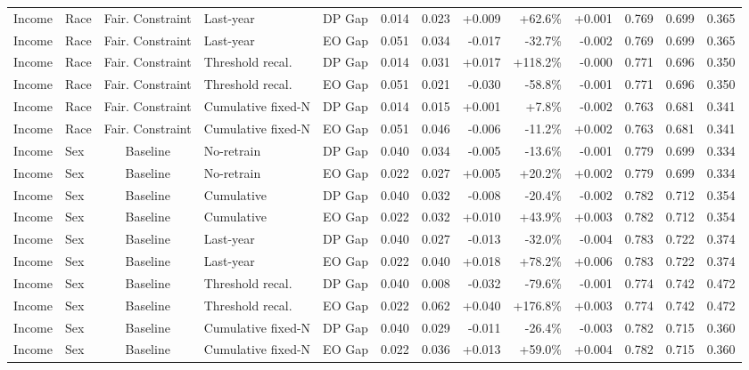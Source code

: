 \begin{longtable}{llcllrrrrrrrr}
Income & Race & Fair. Constraint & Last-year & DP Gap & 0.014 & 0.023 & +0.009 & +62.6\% & +0.001 & 0.769 & 0.699 & 0.365 \\
Income & Race & Fair. Constraint & Last-year & EO Gap & 0.051 & 0.034 & -0.017 & -32.7\% & -0.002 & 0.769 & 0.699 & 0.365 \\
Income & Race & Fair. Constraint & Threshold recal. & DP Gap & 0.014 & 0.031 & +0.017 & +118.2\% & -0.000 & 0.771 & 0.696 & 0.350 \\
Income & Race & Fair. Constraint & Threshold recal. & EO Gap & 0.051 & 0.021 & -0.030 & -58.8\% & -0.001 & 0.771 & 0.696 & 0.350 \\
Income & Race & Fair. Constraint & Cumulative fixed-N & DP Gap & 0.014 & 0.015 & +0.001 & +7.8\% & -0.002 & 0.763 & 0.681 & 0.341 \\
Income & Race & Fair. Constraint & Cumulative fixed-N & EO Gap & 0.051 & 0.046 & -0.006 & -11.2\% & +0.002 & 0.763 & 0.681 & 0.341 \\
Income & Sex & Baseline & No-retrain & DP Gap & 0.040 & 0.034 & -0.005 & -13.6\% & -0.001 & 0.779 & 0.699 & 0.334 \\
Income & Sex & Baseline & No-retrain & EO Gap & 0.022 & 0.027 & +0.005 & +20.2\% & +0.002 & 0.779 & 0.699 & 0.334 \\
Income & Sex & Baseline & Cumulative & DP Gap & 0.040 & 0.032 & -0.008 & -20.4\% & -0.002 & 0.782 & 0.712 & 0.354 \\
Income & Sex & Baseline & Cumulative & EO Gap & 0.022 & 0.032 & +0.010 & +43.9\% & +0.003 & 0.782 & 0.712 & 0.354 \\
Income & Sex & Baseline & Last-year & DP Gap & 0.040 & 0.027 & -0.013 & -32.0\% & -0.004 & 0.783 & 0.722 & 0.374 \\
Income & Sex & Baseline & Last-year & EO Gap & 0.022 & 0.040 & +0.018 & +78.2\% & +0.006 & 0.783 & 0.722 & 0.374 \\
Income & Sex & Baseline & Threshold recal. & DP Gap & 0.040 & 0.008 & -0.032 & -79.6\% & -0.001 & 0.774 & 0.742 & 0.472 \\
Income & Sex & Baseline & Threshold recal. & EO Gap & 0.022 & 0.062 & +0.040 & +176.8\% & +0.003 & 0.774 & 0.742 & 0.472 \\
Income & Sex & Baseline & Cumulative fixed-N & DP Gap & 0.040 & 0.029 & -0.011 & -26.4\% & -0.003 & 0.782 & 0.715 & 0.360 \\
Income & Sex & Baseline & Cumulative fixed-N & EO Gap & 0.022 & 0.036 & +0.013 & +59.0\% & +0.004 & 0.782 & 0.715 & 0.360 \\

\end{longtable}

